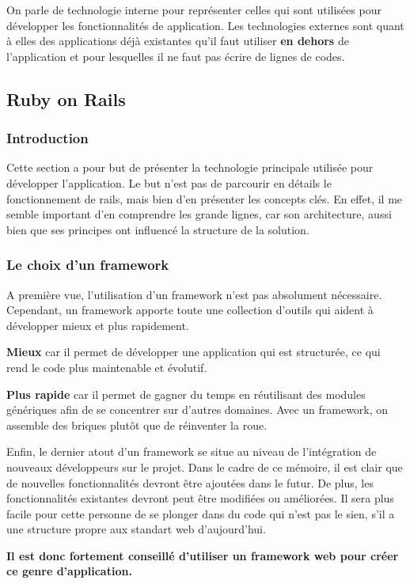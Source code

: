 On parle de technologie interne pour représenter celles qui sont utilisées pour développer les fonctionnalités de application. Les technologies externes sont quant à elles des applications déjà existantes qu'il faut utiliser \textbf{en dehors} de l'application et pour lesquelles il ne faut pas écrire de lignes de codes.\subsection{Ruby on Rails}
\subsubsection{Introduction}

Cette section a pour but de présenter la technologie principale utilisée pour développer l'application. Le but n'est pas de parcourir en détails le fonctionnement de rails, mais bien d'en présenter les concepts clés. En effet, il me semble important d'en comprendre les grande lignes, car son architecture, aussi bien que ses principes ont influencé la structure de la solution.
\subsubsection{Le choix d'un framework}
A première vue, l'utilisation d'un framework n'est pas absolument nécessaire. Cependant, un framework apporte toute une collection d'outils qui aident à développer mieux et plus rapidement.

\textbf{Mieux} car il permet de développer une application qui est structurée, ce qui rend le code plus maintenable et évolutif.

\textbf{Plus rapide} car il permet de gagner du temps en réutilisant des modules génériques afin de se concentrer sur d'autres domaines. Avec un framework, on assemble des briques plutôt que de réinventer la roue. 

Enfin, le dernier atout d'un framework se situe au niveau de l'intégration de nouveaux développeurs sur le projet. Dans le cadre de ce mémoire, il est clair que de nouvelles fonctionnalités devront être ajoutées dans le futur. De plus, les fonctionnalités existantes devront peut être modifiées ou améliorées. Il sera plus facile pour cette personne de se plonger dans du code qui n'est pas le sien, s'il a une structure propre aux standart web d'aujourd'hui.

\textbf{Il est donc fortement conseillé d'utiliser un framework web pour créer ce genre d'application.} 

